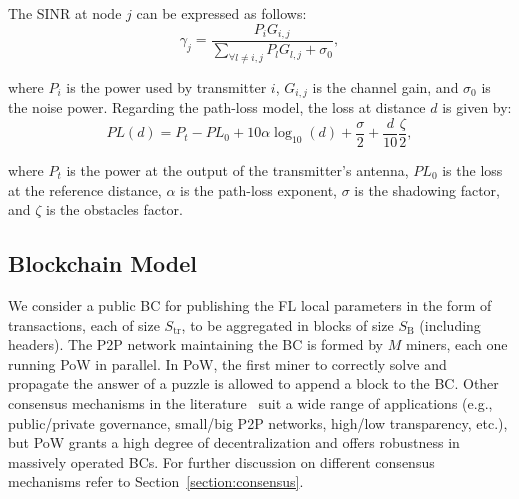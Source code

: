 \documentclass[10pt,journal,compsoc]{IEEEtran}
\begin{document}
The SINR at node $j$ can be expressed as follows:
\begin{equation}
\gamma_j = \frac{P_{i}G_{i,j}}{\sum_{\forall l \neq i,j}P_l G_{l,j} +\sigma_0},
\end{equation}

where $P_{i}$ is the power used by transmitter $i$, $G_{i,j}$ is the channel gain, and $\sigma_0$ is the noise power. Regarding the path-loss model, the loss at distance $d$ is given by:%
\begin{equation}
PL(d) = P_t-PL_0+10 \alpha \log_{10}(d) + \frac{\sigma}{2} + \frac{d}{10} \frac{\zeta}{2},
\end{equation}

where $P_t$ is the power at the output of the transmitter's antenna, $PL_0$ is the loss at the reference distance, $\alpha$ is the path-loss exponent, $\sigma$ is the shadowing factor, and $\zeta$ is the obstacles factor. %

\subsection{Blockchain Model}
\label{section:bc_model}

We consider a public BC for publishing the FL local parameters in the form of transactions, each of size $S_\text{tr}$, to be aggregated in blocks of size $S_\text{B}$ (including headers). The P2P network maintaining the BC is formed by $M$ miners, each one running PoW in parallel. In PoW, the first miner to correctly solve and propagate the answer of a puzzle is allowed to append a block to the BC. Other consensus mechanisms in the literature~\cite{nguyen2018survey} suit a wide range of applications (e.g., public/private governance, small/big P2P networks, high/low transparency, etc.), but PoW grants a high degree of decentralization and offers robustness in massively operated BCs. For further discussion on different consensus mechanisms refer to Section~\ref{section:consensus}.%
\end{document}
